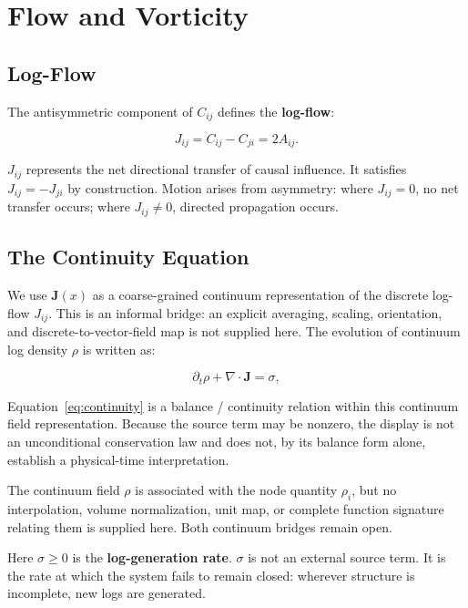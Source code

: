 \section{Flow and Vorticity}
\label{sec:flow}

\subsection{Log-Flow}

The antisymmetric component of $C_{ij}$ defines the \textbf{log-flow}:

\begin{equation}
  J_{ij} = C_{ij} - C_{ji} = 2A_{ij}.
  \label{eq:flow}
\end{equation}

$J_{ij}$ represents the net directional transfer of causal influence.
It satisfies $J_{ij} = -J_{ji}$ by construction.
Motion arises from asymmetry: where $J_{ij} = 0$, no net transfer occurs;
where $J_{ij} \neq 0$, directed propagation occurs.

\subsection{The Continuity Equation}

We use $\mathbf{J}(x)$ as a coarse-grained continuum representation of the
discrete log-flow $J_{ij}$. This is an informal bridge: an explicit averaging,
scaling, orientation, and discrete-to-vector-field map is not supplied here.
The evolution of continuum log density $\rho$ is written as:

\begin{keybox}
\begin{equation}
  \partial_t\rho + \nabla \cdot \mathbf{J} = \sigma,
  \label{eq:continuity}
\end{equation}
\end{keybox}

Equation~\eqref{eq:continuity} is a balance / continuity relation within this
continuum field representation. Because the source term may be nonzero, the
display is not an unconditional conservation law and does not, by its balance
form alone, establish a physical-time interpretation.

The continuum field $\rho$ is associated with the node quantity $\rho_i$, but
no interpolation, volume normalization, unit map, or complete function
signature relating them is supplied here. Both continuum bridges remain open.

Here $\sigma \geq 0$ is the \textbf{log-generation rate}.
$\sigma$ is not an external source term.
It is the rate at which the system fails to remain closed:
wherever structure is incomplete, new logs are generated.


